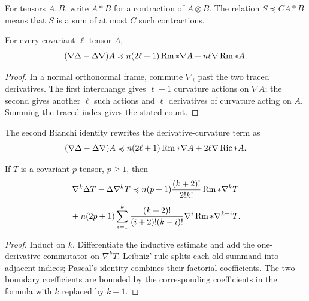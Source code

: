 For tensors \(A,B\), write \(A*B\) for a contraction of \(A\otimes B\).
The relation \(S\preccurlyeq C A*B\) means that \(S\) is a sum of at most
\(C\) such contractions.

\begin{lemma}
\label{lem:chow-ii-nabla-laplacian-commutator}

For every covariant \(\ell\)-tensor \(A\),
\[
 (\nabla\Delta-\Delta\nabla)A
 \preccurlyeq n(2\ell+1)\operatorname{Rm}*\nabla A+n\ell\nabla\operatorname{Rm}*A.
\]
\end{lemma}
\begin{proof}
\sketch
In a normal orthonormal frame, commute \(\nabla_i\) past the two traced
derivatives.  The first interchange gives \(\ell+1\) curvature actions on
\(\nabla A\); the second gives another \(\ell\) such actions and \(\ell\)
derivatives of curvature acting on \(A\).  Summing the traced index gives the
stated count.
\end{proof}

\begin{remark}
\label{rem:chow-ii-nabla-laplacian-bianchi-form}


The second Bianchi identity rewrites the derivative-curvature term as
\[
 (\nabla\Delta-\Delta\nabla)A
 \preccurlyeq n(2\ell+1)\operatorname{Rm}*\nabla A+2\ell\nabla\operatorname{Ric}*A.
\]
\end{remark}

\begin{lemma}
\label{lem:chow-ii-higher-nabla-laplacian-commutator}

If \(T\) is a covariant \(p\)-tensor, \(p\geq1\), then
\[
 \nabla^k\Delta T-\Delta\nabla^kT
 \preccurlyeq n(p+1)\frac{(k+2)!}{2!k!}\operatorname{Rm}*\nabla^kT
\]
\[
 {}+n(2p+1)\sum_{i=1}^k
 \frac{(k+2)!}{(i+2)!(k-i)!}\nabla^i\operatorname{Rm}*\nabla^{k-i}T.
\]
\end{lemma}
\begin{proof}
\sketch
{}
Induct on \(k\).  Differentiate the inductive estimate and add the
one-derivative commutator on \(\nabla^kT\).  Leibniz' rule splits each old
summand into adjacent indices; Pascal's identity combines their factorial
coefficients.  The two boundary coefficients are bounded by the corresponding
coefficients in the formula with \(k\) replaced by \(k+1\).
\end{proof}

